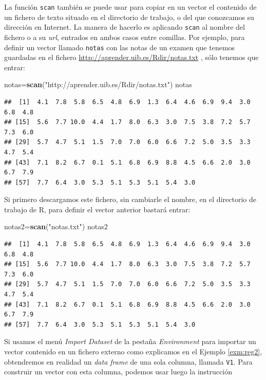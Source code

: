 \documentclass[]{book}
\newenvironment{Shaded}{\begin{snugshade}}{\end{snugshade}}
\newcommand{\KeywordTok}[1]{\textcolor[rgb]{0.13,0.29,0.53}{\textbf{#1}}}
\newcommand{\NormalTok}[1]{#1}
\newcommand{\StringTok}[1]{\textcolor[rgb]{0.31,0.60,0.02}{#1}}
\theoremstyle{definition}
\theoremstyle{definition}
\theoremstyle{definition}
\theoremstyle{remark}
\begin{document}
La función \texttt{scan} también se puede usar para copiar en un vector el contenido de un fichero de texto situado en el directorio de trabajo, o del que conozcamos su dirección en Internet. La manera de hacerlo es aplicando \texttt{scan}
al nombre del fichero o a su \emph{url}, entrados en ambos casos entre comillas. Por ejemplo, para definir un vector llamado \texttt{notas} con las notas de un examen que tenemos guardadas en el fichero
\url{http://aprender.uib.es/Rdir/notas.txt} , sólo tenemos que entrar:

\begin{Shaded}
\begin{Highlighting}[]
\NormalTok{notas=}\KeywordTok{scan}\NormalTok{(}\StringTok{"http://aprender.uib.es/Rdir/notas.txt"}\NormalTok{)}
\NormalTok{notas}
\end{Highlighting}
\end{Shaded}

\begin{verbatim}
##  [1]  4.1  7.8  5.8  6.5  4.8  6.9  1.3  6.4  4.6  6.9  9.4  3.0  6.8  4.8
## [15]  5.6  7.7 10.0  4.4  1.7  8.0  6.3  3.0  7.5  3.8  7.2  5.7  7.3  6.0
## [29]  5.7  4.7  5.1  1.5  7.0  7.0  6.0  6.6  7.2  5.0  3.5  3.3  4.7  5.4
## [43]  7.1  8.2  6.7  0.1  5.1  6.8  6.9  8.8  4.5  6.6  2.0  3.0  6.7  7.9
## [57]  7.7  6.4  3.0  5.3  5.1  5.3  5.1  5.4  3.0
\end{verbatim}

Si primero descargamos este fichero, sin cambiarle el nombre, en el directorio de trabajo de R, para definir el vector anterior bastará entrar:

\begin{Shaded}
\begin{Highlighting}[]
\NormalTok{notas2=}\KeywordTok{scan}\NormalTok{(}\StringTok{"notas.txt"}\NormalTok{)}
\NormalTok{notas2}
\end{Highlighting}
\end{Shaded}

\begin{verbatim}
##  [1]  4.1  7.8  5.8  6.5  4.8  6.9  1.3  6.4  4.6  6.9  9.4  3.0  6.8  4.8
## [15]  5.6  7.7 10.0  4.4  1.7  8.0  6.3  3.0  7.5  3.8  7.2  5.7  7.3  6.0
## [29]  5.7  4.7  5.1  1.5  7.0  7.0  6.0  6.6  7.2  5.0  3.5  3.3  4.7  5.4
## [43]  7.1  8.2  6.7  0.1  5.1  6.8  6.9  8.8  4.5  6.6  2.0  3.0  6.7  7.9
## [57]  7.7  6.4  3.0  5.3  5.1  5.3  5.1  5.4  3.0
\end{verbatim}

Si usamos el menú \emph{Import Dataset} de la pestaña \emph{Environment} para importar un vector contenido en un fichero externo como explicamos en el Ejemplo \ref{exm:reg2}, obtendremos en realidad un \emph{data frame} de una sola columna, llamada \texttt{V1}. Para construir un vector con esta columna, podemos usar luego la instrucción
\end{document}
